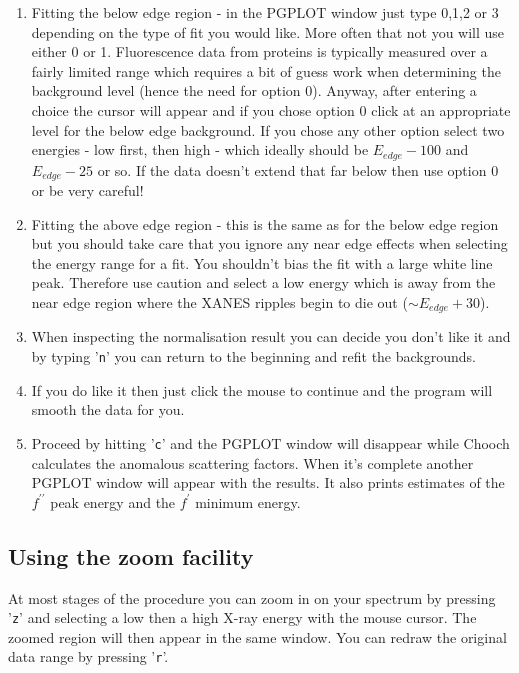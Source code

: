 \documentclass[a4]{article}
\begin{document}
\begin{enumerate}
\item Fitting the below edge region - in the PGPLOT window just type
0,1,2 or 3 depending on the type of fit you would like. More often
that not you will use either 0 or 1. Fluorescence data from proteins
is typically measured over a fairly limited range which requires a bit
of guess work when determining the background level (hence the need for
option 0). Anyway, after entering a choice the cursor will appear and if
you chose option 0 click at an appropriate level for the below
edge background. If you chose any other option select two energies - low
first, then high - which ideally should be $E_{edge} - 100$ and
$E_{edge}-25$ or so. If the data doesn't extend that far below then
use option 0 or be very careful!
\item Fitting the above edge region - this is the same as for the
below edge region but you should take care that you ignore any near
edge effects when selecting the energy range for a fit. You shouldn't
bias the fit with a large white line peak. Therefore use caution and
select a low energy which is away from the near edge region where the
XANES ripples begin to die out ($\sim E_{edge}+30$).
\item When inspecting the normalisation result you can decide you don't like it
and by typing '{\tt n}' you can return to the beginning and refit the backgrounds.
\item If you do like it then just click the mouse to continue and the program will smooth
the data for you.
\item Proceed by hitting '{\tt c}' and the PGPLOT window will disappear while {\sc Chooch}
calculates the anomalous scattering factors. When it's complete another PGPLOT window will
appear with the results. It also prints estimates of the $f^{\prime\prime}$ peak energy
and the $f^{\prime}$ minimum energy.
\end{enumerate}


\subsection{Using the zoom facility}

At most stages of the procedure you can zoom in on your spectrum by
pressing '{\tt z}' and selecting a low then a high X-ray energy with the mouse cursor.
The zoomed region will then appear in the same window. You can redraw the original 
data range by pressing '{\tt r}'.
\end{document}
